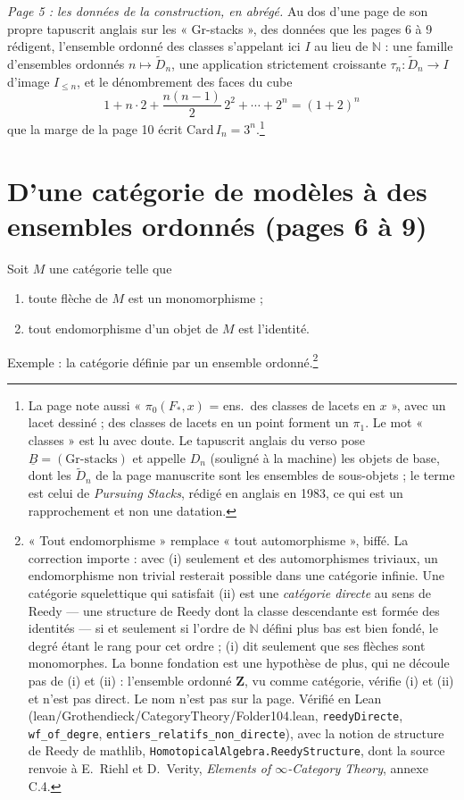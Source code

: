 \documentclass[11pt,a4paper]{article}
\begin{document}
\emph{Page 5 : les données de la construction, en abrégé.} Au dos d'une page
de son propre tapuscrit anglais sur les « Gr-stacks », des données que les
pages 6 à 9 rédigent, l'ensemble ordonné des classes s'appelant ici $I$ au lieu
de $\mathbb{N}$ :
une famille d'ensembles ordonnés $n \mapsto \widetilde{D}_{n}$, une application
strictement croissante $\tau_{n} : \widetilde{D}_{n} \to I$ d'image $I_{\leq n}$,
et le dénombrement des faces du cube
\[
1 + n \cdot 2 + \frac{n(n-1)}{2}\, 2^{2} + \cdots + 2^{n} = (1 + 2)^{n}
\]
que la marge de la page 10 écrit $\mathrm{Card}\, I_{n} = 3^{n}$.\footnote{La page note
aussi « $\pi_{0}(F_{*}, x)$ = ens.\ des classes de lacets en $x$ », avec un lacet
dessiné ; des classes de lacets en un point forment un $\pi_{1}$. Le mot
« classes » est lu avec doute. Le tapuscrit anglais du verso pose
$\underline{B} = (\text{Gr-stacks})$ et appelle $D_{n}$ (souligné à la
machine) les objets de base, dont les $\widetilde{D}_{n}$ de la page
manuscrite sont les ensembles de sous-objets ; le terme
est celui de \emph{Pursuing Stacks}, rédigé en anglais en 1983, ce qui est un
rapprochement et non une datation.}

\section*{D'une catégorie de modèles à des ensembles ordonnés (pages 6 à 9)}

Soit $M$ une catégorie telle que
\begin{enumerate}
\item[(i)] toute flèche de $M$ est un monomorphisme ;
\item[(ii)] tout endomorphisme d'un objet de $M$ est l'identité.
\end{enumerate}
Exemple : la catégorie définie par un ensemble ordonné.\footnote{« Tout
endomorphisme » remplace « tout automorphisme », biffé. La correction
importe : avec (i) seulement et des automorphismes triviaux, un endomorphisme
non trivial resterait possible dans une catégorie infinie. Une catégorie
squelettique qui satisfait (ii) est une \emph{catégorie directe} au sens de
Reedy --- une structure de Reedy dont la classe descendante est formée des
identités --- si et seulement si l'ordre de $\mathbb{N}$ défini plus bas est
bien fondé, le degré étant le rang pour cet ordre ; (i) dit seulement que ses
flèches sont monomorphes. La bonne fondation est une hypothèse de plus, qui ne
découle pas de (i) et (ii) : l'ensemble ordonné $\mathbf{Z}$, vu comme
catégorie, vérifie (i) et (ii) et n'est pas direct. Le nom n'est pas sur la
page. Vérifié en Lean (lean/Grothendieck/CategoryTheory/Folder104.lean,
\texttt{reedyDirecte}, \texttt{wf\_of\_degre},
\texttt{entiers\_relatifs\_non\_directe}), avec la notion de structure de
Reedy de mathlib, \texttt{HomotopicalAlgebra.ReedyStructure}, dont la source
renvoie à E.~Riehl et D.~Verity, \emph{Elements of $\infty$-Category Theory},
annexe C.4.}
\end{document}
